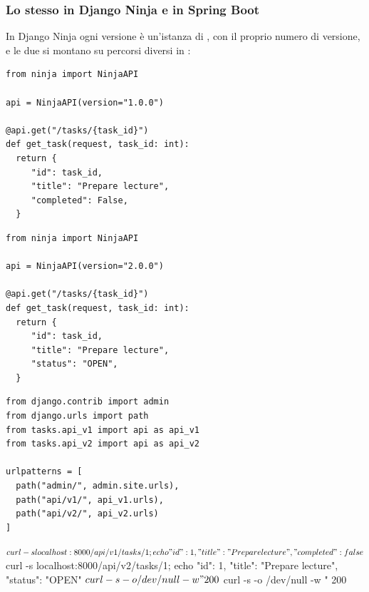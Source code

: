 \subsubsection{Lo stesso in Django Ninja e in Spring Boot}

In Django Ninja ogni versione è un'istanza di , con il proprio
numero di versione, e le due si montano su percorsi diversi in :

\begin{affianco}[0.5]
\codicepiccolo
\begin{lstlisting}[style=python, name=tasks/api_v1.py]
from ninja import NinjaAPI

api = NinjaAPI(version="1.0.0")

@api.get("/tasks/{task_id}")
def get_task(request, task_id: int):
  return {
     "id": task_id,
     "title": "Prepare lecture",
     "completed": False,
  }
\end{lstlisting}
\risultato
\codicepiccolo
\begin{lstlisting}[style=python, name=tasks/api_v2.py]
from ninja import NinjaAPI

api = NinjaAPI(version="2.0.0")

@api.get("/tasks/{task_id}")
def get_task(request, task_id: int):
  return {
     "id": task_id,
     "title": "Prepare lecture",
     "status": "OPEN",
  }
\end{lstlisting}
\end{affianco}

\begin{affianco}[0.5]
\codicepiccolo
\begin{lstlisting}[style=python, name=academy/urls.py]
from django.contrib import admin
from django.urls import path
from tasks.api_v1 import api as api_v1
from tasks.api_v2 import api as api_v2

urlpatterns = [
  path("admin/", admin.site.urls),
  path("api/v1/", api_v1.urls),
  path("api/v2/", api_v2.urls)
]
\end{lstlisting}
\risultato
\begin{console}[Terminale]
$ curl -s localhost:8000/api/v1/tasks/1; echo
{"id": 1, "title": "Prepare lecture", "completed": false}
$ curl -s localhost:8000/api/v2/tasks/1; echo
{"id": 1, "title": "Prepare lecture", "status": "OPEN"}
$ curl -s -o /dev/null -w "%
200
$ curl -s -o /dev/null -w "%
200
\end{console}
\end{affianco}

